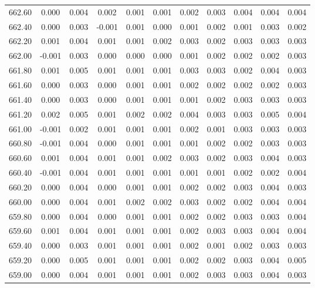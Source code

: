 \begin{longtable}{cccccccccc}
    662.60 &  0.000 &  0.004 &  0.002 &  0.001 &  0.001 &  0.002 &  0.003 &  0.004 &  0.004 &  0.004 \\
    662.40 &  0.000 &  0.003 & -0.001 &  0.001 &  0.000 &  0.001 &  0.002 &  0.001 &  0.003 &  0.002 \\
    662.20 &  0.001 &  0.004 &  0.001 &  0.001 &  0.002 &  0.003 &  0.002 &  0.003 &  0.003 &  0.003 \\
    662.00 & -0.001 &  0.003 &  0.000 &  0.000 &  0.000 &  0.001 &  0.002 &  0.002 &  0.002 &  0.003 \\
    661.80 &  0.001 &  0.005 &  0.001 &  0.001 &  0.001 &  0.003 &  0.003 &  0.002 &  0.004 &  0.003 \\
    661.60 &  0.000 &  0.003 &  0.000 &  0.001 &  0.001 &  0.002 &  0.002 &  0.002 &  0.002 &  0.003 \\
    661.40 &  0.000 &  0.003 &  0.000 &  0.001 &  0.001 &  0.001 &  0.002 &  0.003 &  0.003 &  0.003 \\
    661.20 &  0.002 &  0.005 &  0.001 &  0.002 &  0.002 &  0.004 &  0.003 &  0.003 &  0.005 &  0.004 \\
    661.00 & -0.001 &  0.002 &  0.001 &  0.001 &  0.001 &  0.002 &  0.001 &  0.003 &  0.003 &  0.003 \\
    660.80 & -0.001 &  0.004 &  0.000 &  0.001 &  0.001 &  0.001 &  0.002 &  0.002 &  0.003 &  0.003 \\
    660.60 &  0.001 &  0.004 &  0.001 &  0.001 &  0.002 &  0.003 &  0.002 &  0.003 &  0.004 &  0.003 \\
    660.40 & -0.001 &  0.004 &  0.001 &  0.001 &  0.001 &  0.001 &  0.001 &  0.002 &  0.002 &  0.004 \\
    660.20 &  0.000 &  0.004 &  0.000 &  0.001 &  0.001 &  0.002 &  0.002 &  0.003 &  0.004 &  0.003 \\
    660.00 &  0.000 &  0.004 &  0.001 &  0.002 &  0.002 &  0.003 &  0.002 &  0.002 &  0.004 &  0.004 \\
    659.80 &  0.000 &  0.004 &  0.000 &  0.001 &  0.001 &  0.002 &  0.002 &  0.003 &  0.003 &  0.004 \\
    659.60 &  0.001 &  0.004 &  0.001 &  0.001 &  0.001 &  0.002 &  0.003 &  0.003 &  0.004 &  0.004 \\
    659.40 &  0.000 &  0.003 &  0.001 &  0.001 &  0.001 &  0.002 &  0.001 &  0.002 &  0.003 &  0.003 \\
    659.20 &  0.000 &  0.005 &  0.001 &  0.001 &  0.001 &  0.002 &  0.002 &  0.003 &  0.004 &  0.005 \\
    659.00 &  0.000 &  0.004 &  0.001 &  0.001 &  0.001 &  0.002 &  0.003 &  0.003 &  0.004 &  0.003 \\

\end{longtable}
